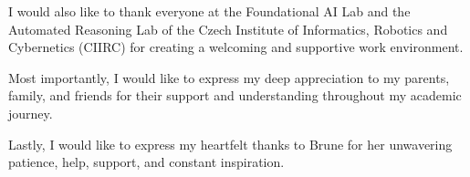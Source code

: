 \documentclass[11pt, twoside, openright]{thesis}
\begin{document}
I would also like to thank everyone at the Foundational AI Lab and the
Automated Reasoning Lab of the Czech Institute of Informatics, Robotics and
Cybernetics (CIIRC) for creating a welcoming and supportive work environment.

Most importantly, I would like to express my deep appreciation to my parents,
family, and friends for their support and understanding throughout my academic
journey.

Lastly, I would like to express my heartfelt thanks to Brune for her unwavering
patience, help, support, and constant inspiration.

\cleardoublepage
\hypertarget{contents}{}
\tableofcontents

\mainmatter










\setlength{}
\printbibliography
\end{document}

